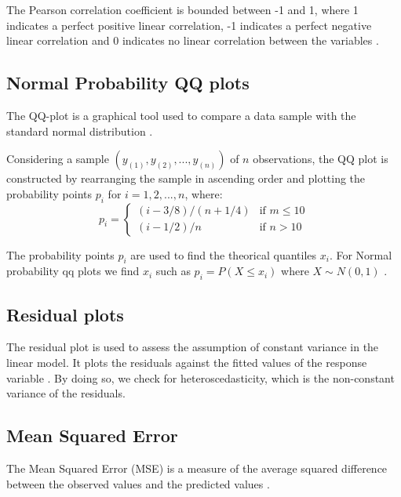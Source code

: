 \documentclass[12 pt]{scrartcl}
\numberwithin{equation}{section}
\begin{document}
The Pearson correlation coefficient is bounded between -1 and 1, where 1 indicates a perfect positive linear correlation,
-1 indicates a perfect negative linear correlation and 0 indicates no linear correlation between the variables \cite[p. 105]{regression}.

\subsection{Normal Probability QQ plots}
\label{subsec:qq-plot}

The QQ-plot is a graphical tool used to compare a data sample with the standard normal distribution
\citep[p.147]{hay2019r}.

Considering a sample $(y_{(1)},y_{(2)},...,y_{(n)})$ of $n$ observations, 
the QQ plot is constructed by rearranging the sample in ascending order and 
plotting the probability points $p_{i}$ for $i = 1, 2,...,n$, 
where:
\[
    p_{i} = 
    \begin{cases}
    (i-3/8)/(n + 1/4) & \mbox{if } m \leq 10 \\[0.2cm]
    (i-1/2)/n & \mbox{if } n > 10
    \end{cases}
\]

The probability points $p_{i}$ are used to find the theorical quantiles $x_{i}$.
For Normal probability qq plots we find $x_{i}$ such as 
$ p_{i} = P(X \leq x_{i}) $ where $X \sim N(0,1)$ \cite[p.148]{hay2019r}.

\subsection{Residual plots}
\label{subsec:residual-plot}

The residual plot is used to assess the assumption of constant variance in the linear model.
It plots the residuals against the fitted values of the response variable \cite[p.149]{hay2019r}.
By doing so, we check for heteroscedasticity, which is the non-constant variance of the residuals.




\subsection{Mean Squared Error}
\label{subsec:Mean Squared Error}

The Mean Squared Error (MSE) is a measure of the average squared difference between the observed values and the predicted values
\cite[p.50]{stat-learning}.
\end{document}
